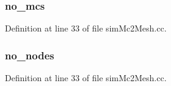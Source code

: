 \subsubsection[{no\_\-mcs}]{ {\bf no\_\-mcs}}\label{genericTPG__clubbed_8h_56d27d790e05179f3787fce80d802d04}




Definition at line 33 of file simMc2Mesh.cc.
\subsubsection[{no\_\-nodes}]{ {\bf no\_\-nodes}}\label{genericTPG__clubbed_8h_b78c10782810279fb9680eafef33b77d}




Definition at line 33 of file simMc2Mesh.cc.